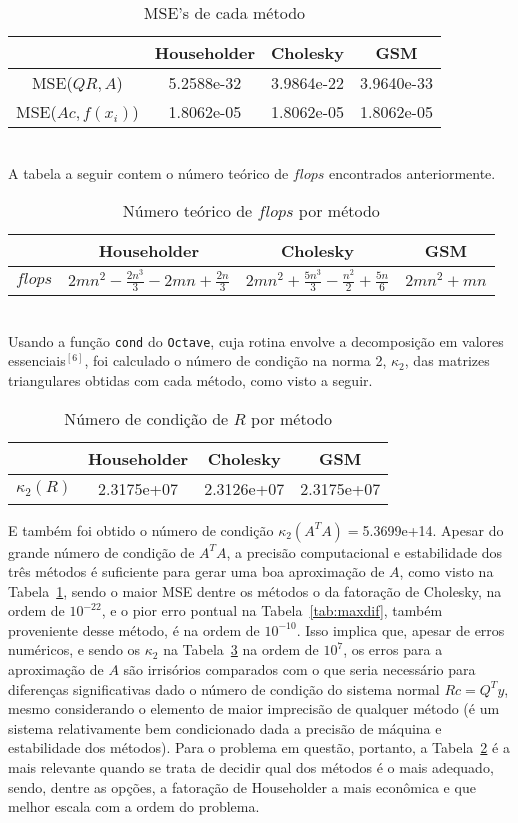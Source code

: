 \documentclass[a4paper, 12pt]{article}
\begin{document}
\begin{table}[h]
\centering
\caption{\label{tab:mse} MSE's de cada método}
\begin{tabular}{|c||c|c|c|}
\hline&Householder&Cholesky&GSM\\
\hline \hline MSE($QR,A$)&5.2588e-32&3.9864e-22&3.9640e-33\\
\hline MSE($Ac,f(x_i)$)&1.8062e-05&1.8062e-05&1.8062e-05\\ \hline
\end{tabular}
\end{table}
\\
A tabela a seguir contem o número teórico de $flops$ encontrados anteriormente.
\begin{table}[h]
\centering
\caption{\label{tab:flo} Número teórico de $flops$ por método}
\begin{tabular}{|c||c|c|c|}
\hline&Householder&Cholesky&GSM\\
\hline \hline $flops$&$2mn^2-\frac{2n^3}{3}-2mn+\frac{2n}{3}$&$2mn^2+\frac{5n^3}{3}-\frac{n^2}{2}+\frac{5n}{6}$&$2mn^2+mn$\\ \hline
\end{tabular}
\end{table}
\\
Usando a função \verb+cond+ do \verb+Octave+, cuja rotina envolve a decomposição em valores essenciais$^{[6]}$, foi calculado o número de condição na norma 2, $\kappa_2$, das matrizes triangulares obtidas com cada método, como visto a seguir.
\begin{table}[H]
\centering
\caption{\label{tab:kap} Número de condição de $R$ por método}
\begin{tabular}{|c||c|c|c|}
\hline&Householder&Cholesky&GSM\\
\hline \hline $\kappa_2(R)$&2.3175e+07&2.3126e+07&2.3175e+07\\ \hline
\end{tabular}
\end{table}
E também foi obtido o número de condição $\kappa_2(A^TA)=$5.3699e+14. Apesar do grande número de condição de $A^TA$, a precisão computacional e estabilidade dos três métodos é suficiente para gerar uma boa aproximação de $A$, como visto na Tabela~\ref{tab:mse}, sendo o maior MSE dentre os métodos o da fatoração de Cholesky, na ordem de $10^{-22}$, e o pior erro pontual na Tabela~\ref{tab:maxdif}, também proveniente desse método, é na ordem de $10^{-10}$. Isso implica que, apesar de erros numéricos, e sendo os $\kappa_2$ na Tabela~\ref{tab:kap} na ordem de $10^7$, os erros para a aproximação de $A$ são irrisórios comparados com o que seria necessário para diferenças significativas dado o número de condição do sistema normal $Rc=Q^Ty$, mesmo considerando o elemento de maior imprecisão de qualquer método (é um sistema relativamente bem condicionado dada a precisão de máquina e estabilidade dos métodos). Para o problema em questão, portanto, a Tabela~\ref{tab:flo} é a mais relevante quando se trata de decidir qual dos métodos é o mais adequado, sendo, dentre as opções, a fatoração de Householder a mais econômica e que melhor escala com a ordem do problema.
\end{document}
